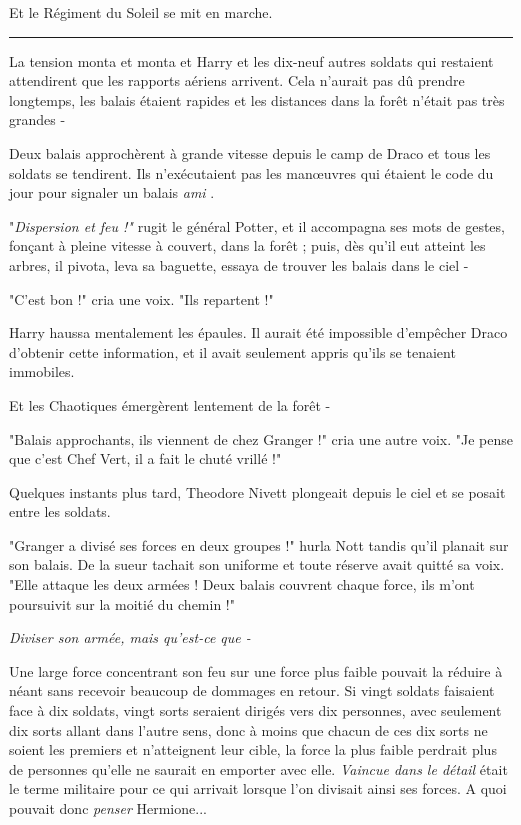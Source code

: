 Et le Régiment du Soleil se mit en marche.
\par\noindent\rule{\textwidth}{0.4pt}
La tension monta et monta et Harry et les dix-neuf autres soldats qui restaient attendirent que les rapports aériens arrivent. Cela n'aurait pas dû prendre longtemps, les balais étaient rapides et les distances dans la forêt n'était pas très grandes -

Deux balais approchèrent à grande vitesse depuis le camp de Draco et tous les soldats se tendirent. Ils n'exécutaient pas les manœuvres qui étaient le code du jour pour signaler un balais \emph{ami} .

"\emph{Dispersion et feu !"}  rugit le général Potter, et il accompagna ses mots de gestes, fonçant à pleine vitesse à couvert, dans la forêt ; puis, dès qu'il eut atteint les arbres, il pivota, leva sa baguette, essaya de trouver les balais dans le ciel -

"C'est bon !" cria une voix. "Ils repartent !"

Harry haussa mentalement les épaules. Il aurait été impossible d'empêcher Draco d'obtenir cette information, et il avait seulement appris qu'ils se tenaient immobiles.

Et les Chaotiques émergèrent lentement de la forêt -

"Balais approchants, ils viennent de chez Granger !" cria une autre voix. "Je pense que c'est Chef Vert, il a fait le chuté vrillé !"

Quelques instants plus tard, Theodore Nivett plongeait depuis le ciel et se posait entre les soldats.

"Granger a divisé ses forces en deux groupes !" hurla Nott tandis qu'il planait sur son balais. De la sueur tachait son uniforme et toute réserve avait quitté sa voix. "Elle attaque les deux armées ! Deux balais couvrent chaque force, ils m'ont poursuivit sur la moitié du chemin !"

\emph{Diviser son armée, mais qu'est-ce que -} 

Une large force concentrant son feu sur une force plus faible pouvait la réduire à néant sans recevoir beaucoup de dommages en retour. Si vingt soldats faisaient face à dix soldats, vingt sorts seraient dirigés vers dix personnes, avec seulement dix sorts allant dans l'autre sens, donc à moins que chacun de ces dix sorts ne soient les premiers et n'atteignent leur cible, la force la plus faible perdrait plus de personnes qu'elle ne saurait en emporter avec elle. \emph{Vaincue dans le détail}  était le terme militaire pour ce qui arrivait lorsque l'on divisait ainsi ses forces. A quoi pouvait donc \emph{penser}  Hermione...


